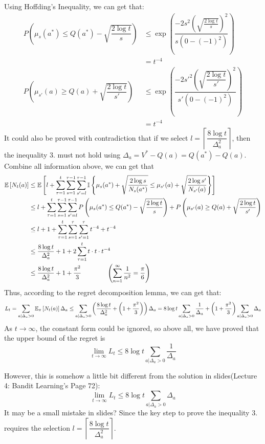 Using Hoffding's Inequality, we can get that:
\begin{align*}
P\left(\mu_s(a^*)\leq Q(a^*) - \sqrt{\dfrac{2\log t}{s}}\right) &\leq \exp\left(\dfrac{-2s^2\left(\sqrt{\frac{2\log t}{s}}\right)^2}{s(0-(-1)^2)}\right) \\
&= t^{-4} \\
P\left(\mu_{s'}(a)\geq Q(a) + \sqrt{\dfrac{2\log t}{s'}}\right) &\leq \exp\left(\dfrac{-2s'^2\left(\sqrt{\dfrac{2\log t}{s'}}\right)^2}{s'(0-(-1)^2)}\right) \\
&= t^{-4}
\end{align*}
It could also be proved with contradiction that if we select $l=\left\lceil\dfrac{8\log t}{\Delta_a^2}\right\rceil$, then the inequality 3. must not hold using $\Delta_a=V^*-Q(a)=Q(a^*)-Q(a)$. \\
Combine all information above, we can get that
\begin{align*}
\mathbb{E}\left[N_t(a)\right] &\leq \mathbb{E}\left[l + \sum_{\tau=1}^{t}\sum_{s=1}^{\tau-1}\sum_{s'=l}^{\tau-1}\mathbb{I}\left\{\mu_{s}(a^*)+\sqrt{\frac{2\log s}{N_{s}(a^*)}}\leq \mu_{s'}(a)+\sqrt{\frac{2\log s'}{N_{s'}(a)}}\right\}\right] \\
&\leq l + \sum_{\tau=1}^{t}\sum_{s=1}^{\tau-1}\sum_{s'=l}^{\tau-1}P\left(\mu_s(a^*)\leq Q(a^*) - \sqrt{\dfrac{2\log t}{s}}\right) + P\left(\mu_{s'}(a)\geq Q(a) + \sqrt{\dfrac{2\log t}{s'}}\right) \\
&\leq l + 1 + \sum_{\tau=1}^{t}\sum_{s=1}^{\tau}\sum_{s'=1}^{\tau}t^{-4} + t^{-4} \\
&\leq \dfrac{8\log t}{\Delta_a^2} + 1 + 2\sum_{\tau=1}^{t}t\cdot t\cdot t^{-4} \\
&\leq \dfrac{8\log t}{\Delta_a^2} + 1 + \dfrac{\pi^2}{3} \qquad\qquad\left(\sum_{n=1}^{\infty}\dfrac{1}{n^2}=\dfrac{\pi}{6}\right)
\end{align*}
Thus, according to the regret decomposition lemma, we can get that:
$$L_t = \sum_{a|\Delta_a>0}\mathbb{E}_{\pi}\left[N_t(a)\right]\Delta_a \leq \sum_{a|\Delta_a>0}\left(\dfrac{8\log t}{\Delta_a^2} + \left(1+\dfrac{\pi^2}{3}\right)\right)\Delta_a = 8\log t\sum_{a|\Delta_a>0}\dfrac{1}{\Delta_a} + \left(1+\dfrac{\pi^2}{3}\right)\sum_{a|\Delta_a>0}\Delta_a$$
As $t\to\infty$, the constant form could be ignored, so above all, we have proved that the upper bound of the regret is
$$\lim_{t\to\infty} L_t\leq 8\log t\sum_{a|\Delta_a>0}\dfrac{1}{\Delta_a}$$

However, this is somehow a little bit different from the solution in slides(Lecture 4: Bandit Learning's Page 72):
$$\lim_{t\to\infty} L_t\leq 8\log t\sum_{a|\Delta_a>0}\Delta_a$$
It may be a small mistake in slides? Since the key step to prove the inequality 3. requires the selection $l=\left\lceil\dfrac{8\log t}{\Delta_a^2}\right\rceil$.

